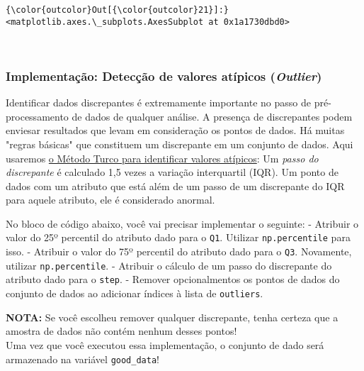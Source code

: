 \documentclass[11pt]{article}
\begin{document}
\begin{Verbatim}[commandchars=\\\{\}]
{\color{outcolor}Out[{\color{outcolor}21}]:} <matplotlib.axes.\_subplots.AxesSubplot at 0x1a1730dbd0>
\end{Verbatim}
            
    \begin{center}
    \end{center}
    { \hspace*{\fill} \\}
    
    \subsubsection{\texorpdfstring{Implementação: Detecção de valores
atípicos
(\emph{Outlier})}{Implementação: Detecção de valores atípicos (Outlier)}}\label{implementauxe7uxe3o-detecuxe7uxe3o-de-valores-atuxedpicos-outlier}

Identificar dados discrepantes é extremamente importante no passo de
pré-processamento de dados de qualquer análise. A presença de
discrepantes podem enviesar resultados que levam em consideração os
pontos de dados. Há muitas "regras básicas" que constituem um
discrepante em um conjunto de dados. Aqui usaremos
\href{http://datapigtechnologies.com/blog/index.php/highlighting-outliers-in-your-data-with-the-tukey-method/}{o
Método Turco para identificar valores atípicos}: Um \emph{passo do
discrepante} é calculado 1,5 vezes a variação interquartil (IQR). Um
ponto de dados com um atributo que está além de um passo de um
discrepante do IQR para aquele atributo, ele é considerado anormal.

No bloco de código abaixo, você vai precisar implementar o seguinte: -
Atribuir o valor do 25º percentil do atributo dado para o \texttt{Q1}.
Utilizar \texttt{np.percentile} para isso. - Atribuir o valor do 75º
percentil do atributo dado para o \texttt{Q3}. Novamente, utilizar
\texttt{np.percentile}. - Atribuir o cálculo de um passo do discrepante
do atributo dado para o \texttt{step}. - Remover opcionalmentos os
pontos de dados do conjunto de dados ao adicionar índices à lista de
\texttt{outliers}.

\textbf{NOTA:} Se você escolheu remover qualquer discrepante, tenha
certeza que a amostra de dados não contém nenhum desses pontos!\\
Uma vez que você executou essa implementação, o conjunto de dado será
armazenado na variável \texttt{good\_data}!
\end{document}
